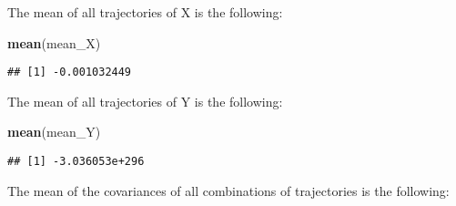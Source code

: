 \documentclass[]{article}
\newenvironment{Shaded}{\begin{snugshade}}{\end{snugshade}}
\newcommand{\ControlFlowTok}[1]{\textcolor[rgb]{0.13,0.29,0.53}{\textbf{#1}}}
\newcommand{\DecValTok}[1]{\textcolor[rgb]{0.00,0.00,0.81}{#1}}
\newcommand{\KeywordTok}[1]{\textcolor[rgb]{0.13,0.29,0.53}{\textbf{#1}}}
\newcommand{\NormalTok}[1]{#1}
\newcommand{\OperatorTok}[1]{\textcolor[rgb]{0.81,0.36,0.00}{\textbf{#1}}}
\newcommand{\StringTok}[1]{\textcolor[rgb]{0.31,0.60,0.02}{#1}}
\begin{document}
The mean of all trajectories of X is the following:

\begin{Shaded}
\begin{Highlighting}[]
\KeywordTok{mean}\NormalTok{(mean_X)}
\end{Highlighting}
\end{Shaded}

\begin{verbatim}
## [1] -0.001032449
\end{verbatim}

The mean of all trajectories of Y is the following:

\begin{Shaded}
\begin{Highlighting}[]
\KeywordTok{mean}\NormalTok{(mean_Y)}
\end{Highlighting}
\end{Shaded}

\begin{verbatim}
## [1] -3.036053e+296
\end{verbatim}

The mean of the covariances of all combinations of trajectories is the
following:

\begin{Shaded}
\end{Shaded}
\end{document}
